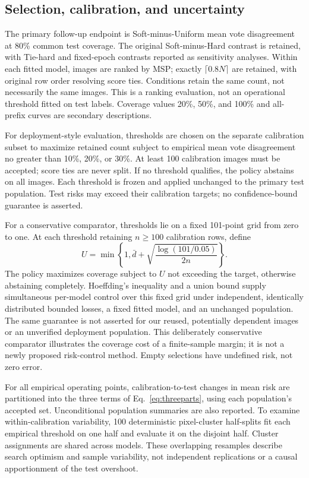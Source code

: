 \documentclass[pdflatex,sn-mathphys-num]{sn-jnl}
\begin{document}
\subsection{Selection, calibration, and uncertainty}
The primary follow-up endpoint is Soft-minus-Uniform mean vote disagreement at 80\% common test coverage. The original Soft-minus-Hard contrast is retained, with Tie-hard and fixed-epoch contrasts reported as sensitivity analyses. Within each fitted model, images are ranked by MSP; exactly $\lceil0.8N\rceil$ are retained, with original row order resolving score ties. Conditions retain the same count, not necessarily the same images. This is a ranking evaluation, not an operational threshold fitted on test labels. Coverage values 20\%, 50\%, and 100\% and all-prefix curves are secondary descriptions.

For deployment-style evaluation, thresholds are chosen on the separate calibration subset to maximize retained count subject to empirical mean vote disagreement no greater than 10\%, 20\%, or 30\%. At least 100 calibration images must be accepted; score ties are never split. If no threshold qualifies, the policy abstains on all images. Each threshold is frozen and applied unchanged to the primary test population. Test risks may exceed their calibration targets; no confidence-bound guarantee is asserted.

For a conservative comparator, thresholds lie on a fixed 101-point grid from zero to one. At each threshold retaining $n\geq100$ calibration rows, define
\begin{equation}
U=\min\!\left\{1,\bar d+\sqrt{\frac{\log(101/0.05)}{2n}}\right\}.
\end{equation}
The policy maximizes coverage subject to $U$ not exceeding the target, otherwise abstaining completely. Hoeffding's inequality \cite{hoeffding1963} and a union bound supply simultaneous per-model control over this fixed grid under independent, identically distributed bounded losses, a fixed fitted model, and an unchanged population. The same guarantee is not asserted for our reused, potentially dependent images or an unverified deployment population. This deliberately conservative comparator illustrates the coverage cost of a finite-sample margin; it is not a newly proposed risk-control method. Empty selections have undefined risk, not zero error.

For all empirical operating points, calibration-to-test changes in mean risk are partitioned into the three terms of Eq.~\ref{eq:threeparts}, using each population's accepted set. Unconditional population summaries are also reported. To examine within-calibration variability, 100 deterministic pixel-cluster half-splits fit each empirical threshold on one half and evaluate it on the disjoint half. Cluster assignments are shared across models. These overlapping resamples describe search optimism and sample variability, not independent replications or a causal apportionment of the test overshoot.
\end{document}
